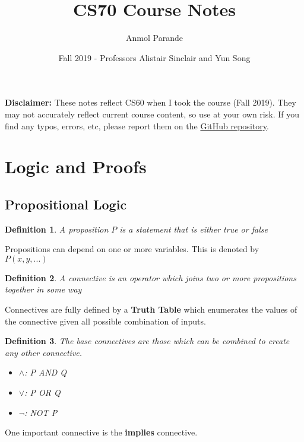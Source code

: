 \documentclass{article}
\newtheorem{definition}{Definition}
\begin{document}
\title{CS70 Course Notes}
\author{Anmol Parande}
\date{Fall 2019 - Professors Alistair Sinclair and Yun Song}
\maketitle
\textbf{Disclaimer: }These notes reflect CS60 when I took the course (Fall 2019). They may not accurately reflect current course content, so use at your own risk.
If you find any typos, errors, etc, please report them on the \href{https://github.com/parandea17/BerkeleyNotes}{GitHub repository}.\\
\tableofcontents
\newpage
\section{Logic and Proofs}
\subsection{Propositional Logic}
\begin{definition}
    A proposition $P$ is a statement that is either true or false
\end{definition}
Propositions can depend on one or more variables. This is denoted by $P(x, y, ...)$
\begin{definition}
    A connective is an operator which joins two or more propositions together in some way
\end{definition}
Connectives are fully defined by a \textbf{Truth Table} which enumerates the values of the connective
given all possible combination of inputs.
\begin{definition}
    The base connectives are those which can be combined to create any other connective.
    \begin{itemize}
        \item $\land$: P AND Q
        \item $\lor$: P OR Q
        \item $\lnot$: NOT P
    \end{itemize}
\end{definition}
One important connective is the \textbf{implies} connective.
\end{document}
